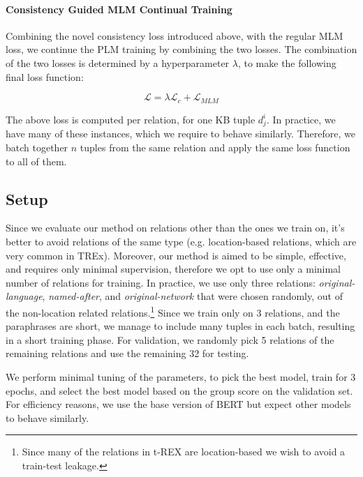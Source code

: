 \paragraph{Consistency Guided MLM Continual Training}

Combining the novel consistency loss introduced above, with the regular MLM loss, we continue the PLM training by combining the two losses. The combination of the two losses is determined by a hyperparameter $\lambda$, to make the following final loss function:

\[
\mathcal{L} = \lambda \mathcal{L}_c + \mathcal{L}_{MLM}
\]

The above loss is computed per relation, for one KB tuple $d_j^i$. In practice, we have many of these instances, which we require to behave similarly. Therefore, we batch together $n$ tuples from the same relation and apply the same loss function to all of them.


\subsection{Setup}

Since we evaluate our method on relations other than the ones we train on, it's better to avoid relations of the same type (e.g. location-based relations, which are very common in TREx).
Moreover, our method is aimed to be simple, effective, and requires only minimal supervision, therefore we opt to use only a minimal number of relations for training.
In practice, we use only three relations: \textit{original-language}, \textit{named-after}, and \textit{original-network} that were chosen randomly, out of the non-location related relations.\footnote{Since many of the relations in t-REX are location-based we wish to avoid a train-test leakage.} %
Since we train only on 3 relations, and the paraphrases are short, we manage to include many tuples in each batch, resulting in a short training phase.
For validation, we randomly pick 5 relations %
of the remaining relations and use the remaining 32 for testing.

We perform minimal tuning of the parameters, to pick the best model, train for 3 epochs, and select the best model based on the group score on the validation set.
For efficiency reasons, we use the base version of BERT but expect other models to behave similarly.


